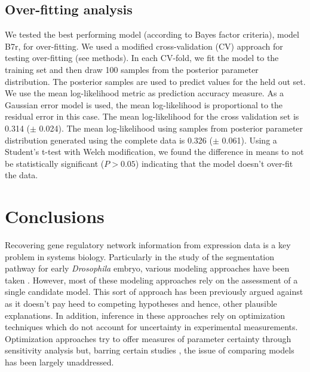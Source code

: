 \subsection{Over-fitting analysis}
We tested the best performing model (according to Bayes factor criteria), model B7r, for over-fitting. We used a modified cross-validation (CV) approach for testing over-fitting (see methods). In each CV-fold, we fit the model to the training set and then draw 100 samples from the posterior parameter distribution. The posterior samples are used to predict values for the held out set. We use the mean log-likelihood metric as prediction accuracy measure. As a Gaussian error model is used, the mean log-likelihood is proportional to the residual error in this case.  The mean log-likelihood for the cross validation set is 0.314 ($\pm$ 0.024). The mean log-likelihood using samples from posterior parameter distribution generated using the complete data is 0.326 ($\pm$ 0.061). Using a Student's t-test with Welch modification, we found the difference in means to not be statistically significant ($P > 0.05$) indicating that the model doesn't over-fit the data.

\section{Conclusions}

Recovering gene regulatory network information from expression data is a key problem in systems biology. Particularly in the study of the segmentation pathway for early \textit{Drosophila} embryo, various modeling approaches have been taken \cite{jaeger04b, jaeger06b, papatsenko11}. However, most of these modeling approaches rely on the assessment of a single candidate model. This sort of approach has been previously argued against \cite{chamberlin1890} as it doesn't pay heed to competing hypotheses and hence, other plausible explanations. In addition, inference in these approaches rely on optimization techniques which do not account for uncertainty in experimental measurements. Optimization approaches try to offer measures of parameter certainty through sensitivity analysis but, barring certain studies \cite{Rodriguez13}, the issue of comparing models has been largely unaddressed. 

